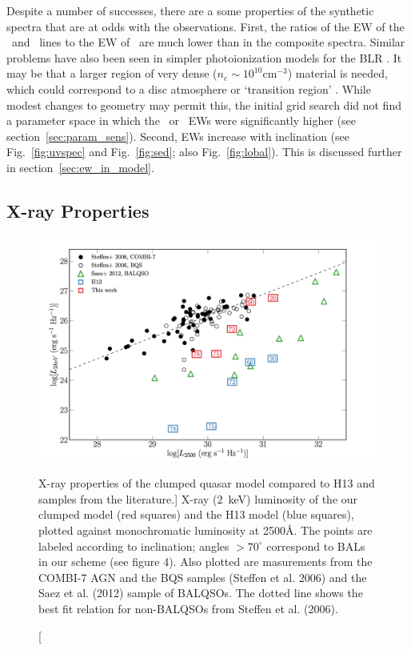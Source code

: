 Despite a number of successes, 
there are a some properties of the synthetic spectra
that are at odds with the observations. First, the ratios of the 
EW of the \la\ and \mgline\ lines
to the EW of \civline\ are much lower than in the composite spectra. 
Similar problems have also been seen in simpler photoionization models for the 
BLR \citep{netzer1990}.
It may be that a larger region of very dense ($n_e\sim10^{10}$cm$^{-3}$) 
material is needed, which could correspond to a disc atmosphere or 
`transition region' 
\citep[see e.g.][]{MCGV95,knigge1998}. \nocite{knigge1998} 
While modest changes to geometry may permit this, the initial grid search 
did not find a parameter space in which the \la\ or \mg\ EWs
were significantly higher (see section~\ref{sec:param_sens}). 
Second, EWs increase with inclination 
(see Fig.~\ref{fig:uvspec} and Fig.~\ref{fig:sed}; also Fig.~\ref{fig:lobal}).
This is discussed further in section~\ref{sec:ew_in_model}.

\subsection{X-ray Properties}
\label{sec:xray}


\begin{figure}
\centering
\includegraphics[width=1.0\textwidth]{figures/06-agnpaper/fig6.png}
\caption
[X-ray properties of the clumped quasar model compared to H13 and samples
from the literature.]
{
X-ray ($2$~keV) luminosity of the our clumped model (red squares) 
and the H13 model (blue squares), plotted against monochromatic luminosity 
at 2500\AA. The points are labeled according to inclination; angles
$>70^\circ$ correspond to BALs in our scheme (see figure 4).
Also plotted are masurements from 
the COMBI-7 AGN and the BQS samples (Steffen et al. 2006) and the Saez et al. (2012) 
sample of BALQSOs. The dotted line shows the best fit relation for non-BALQSOs 
from Steffen et al. (2006).
}
\label{fig:xray}
\end{figure}

